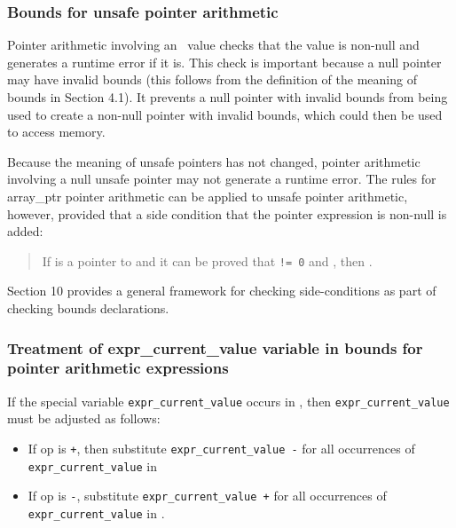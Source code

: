 \subsubsection{Bounds for unsafe pointer arithmetic}
\label{bounds-for-unsafe-pointer-arithmetic}

Pointer arithmetic involving an \arrayptr\ value checks that
the value is non-null and generates a runtime error if it is. This check
is important because a null pointer may have invalid bounds (this
follows from the definition of the meaning of bounds in Section 4.1). It
prevents a null pointer with invalid bounds from being used to create a
non-null pointer with invalid bounds, which could then be used to access
memory.

Because the meaning of unsafe pointers has not changed, pointer
arithmetic involving a null unsafe pointer may not generate a runtime
error. The rules for array\_ptr pointer arithmetic can be applied to
unsafe pointer arithmetic, however, provided that a side condition that
the pointer expression is non-null is added:

\begin{quote}
If  is a pointer to  and it can be proved that
 \texttt{!= 0} and 
, then
.
\end{quote}

Section 10 provides a general framework for checking side-conditions as
part of checking bounds declarations.

\subsubsection{Treatment of expr\_current\_value variable in bounds for
pointer arithmetic
expressions}\label{treatment-of-exprux5fcurrentux5fvalue-variable-in-bounds-for-pointer-arithmetic-expressions}

If the special variable \texttt{expr\_current\_value} occurs in
, then
\texttt{expr\_current\_value} must be adjusted as follows:

\begin{itemize}
\item
  If op is \texttt{+}, then substitute \texttt{expr\_current\_value -}
   for all occurrences of \texttt{expr\_current\_value} in
\item
  If op is \texttt{-}, substitute \texttt{expr\_current\_value +}
   for all occurrences of \texttt{expr\_current\_value} in
  .
\end{itemize}

